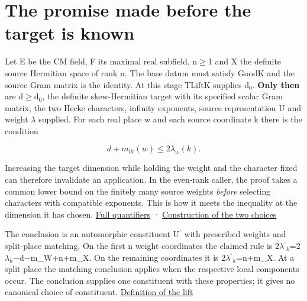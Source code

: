 \documentclass[11pt,letterpaper]{article}
\begin{document}
\section{The promise made before the target is known}
Let E be the CM field, F its maximal real subfield, n\ensuremath{\ge}1 and X the definite source Hermitian space of rank n. The base datum must satisfy {\ttfamily\small GoodK} and the source Gram matrix is the identity. At this stage {\ttfamily\small TLiftK} supplies d\ensuremath{{}_{0}}. \textbf{Only then} are d\ensuremath{\ge}d\ensuremath{{}_{0}}, the definite skew-Hermitian target with its specified scalar Gram matrix, the two Hecke characters, infinity exponents, source representation U and weight \ensuremath{\lambda} supplied. For each real place w and each source coordinate k there is the condition

\[d + m_W(w) \leq 2\lambda_w(k).\]

Increasing the target dimension while holding the weight and the character fixed can therefore invalidate an application. In the even-rank caller, the proof takes a common lower bound on the finitely many source weights \emph{before} selecting characters with compatible exponents. This is how it meets the inequality at the dimension it has chosen. \href{https://github.com/nousentllc/riemann-hypothesis/blob/40e56bab026552e089d7afcfeff08d2defb9c005/src/Development/AutomorphicArithmetic/Foundations/GaloisRepresentations/ThetaParseval/HalfIndexLattices/TLiftK.lean\#L12-L23}{Full quantifiers} · \href{https://github.com/nousentllc/riemann-hypothesis/blob/40e56bab026552e089d7afcfeff08d2defb9c005/src/Development/AutomorphicArithmetic/Foundations/GaloisRepresentations/ThetaParseval/TwoUpOKOfSteps.lean\#L13-L33}{Construction of the two choices}

The conclusion is an automorphic constituent U\ensuremath{{}^{\prime}} with prescribed weights and split-place matching. On the first n weight coordinates the claimed rule is 2\ensuremath{\lambda}\ensuremath{{}^{\prime}}\ensuremath{{}_{k}}=2\ensuremath{\lambda}\ensuremath{{}_{k}}\ensuremath{-}d\ensuremath{-}m\_W+n+m\_X. On the remaining coordinates it is 2\ensuremath{\lambda}\ensuremath{{}^{\prime}}\ensuremath{{}_{k}}=n+m\_X. At a split place the matching conclusion applies when the respective local components occur. The conclusion supplies one constituent with these properties; it gives no canonical choice of constituent. \href{https://github.com/nousentllc/riemann-hypothesis/blob/40e56bab026552e089d7afcfeff08d2defb9c005/src/Development/AutomorphicArithmetic/Foundations/GaloisRepresentations/ThetaParseval/SchurStep.lean\#L103-L112}{Definition of the lift}
\end{document}
